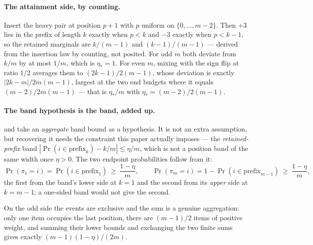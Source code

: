 
\paragraph{The attainment side, by counting.}
Insert the heavy pair at position $p+1$ with $p$ uniform on $\{0,\dots,m-2\}$. Then $+3$ lies
in the prefix of length $k$ exactly when $p<k$ and $-3$ exactly when $p<k-1$, so the retained
marginals are $k/(m-1)$ and $(k-1)/(m-1)$ --- derived from the insertion law by counting, not
posited. For odd $m$ both deviate from $k/m$ by at most $1/m$, which is $\eta_{*}=1$. For even
$m$, mixing with the sign flip at ratio $1/2$ averages them to $(2k-1)/2(m-1)$, whose
deviation is exactly $|2k-m|/2m(m-1)$, largest at the two end budgets where it equals
$(m-2)/2m(m-1)$ --- that is $\eta_{*}/m$ with $\eta_{*}=(m-2)/2(m-1)$.



\paragraph{The band hypothesis is the band, added up.}
 and  take an \emph{aggregate} band bound as a
hypothesis. It is not an extra assumption, but recovering it needs the constraint this paper
actually imposes --- the \emph{retained-prefix} band
$|\Pr(i\in\mathrm{prefix}_{k})-k/m|\le\eta/m$, which is not a position band of the same
width once $\eta>0$. The two endpoint probabilities follow from it:
\[
\Pr(\pi_{1}=i)=\Pr(i\in\mathrm{prefix}_{1})\ \ge\ \frac{1-\eta}{m},
\qquad
\Pr(\pi_{m}=i)=1-\Pr(i\in\mathrm{prefix}_{m-1})\ \ge\ \frac{1-\eta}{m},
\]
the first from the band's lower side at $k=1$ and the second from its \emph{upper} side at
$k=m-1$; a one-sided band would not give the second.

On the odd side the events are exclusive and the sum is a genuine aggregation: only one item
occupies the last position, there are $(m-1)/2$ items of positive weight, and summing their
lower bounds and exchanging the two finite sums gives exactly $(m-1)(1-\eta)/(2m)$.

